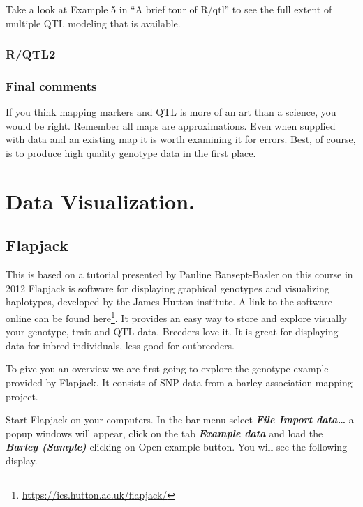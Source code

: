 \documentclass[
]{book}
\renewcommand{\href}[2]{#2\footnote{\url{#1}}}
\begin{document}
Take a look at Example 5 in ``A brief tour of R/qtl'' to see the full extent of multiple QTL modeling that is available.

\hypertarget{rqtl2}{%
\subsection{R/QTL2}\label{rqtl2}}

\hypertarget{final-comments}{%
\subsection{Final comments}\label{final-comments}}

If you think mapping markers and QTL is more of an art than a science, you would be right. Remember all maps are approximations. Even when supplied with data and an existing map it is worth examining it for errors. Best, of course, is to produce high quality genotype data in the first place.

\hypertarget{Data_Visualization}{%
\chapter{Data Visualization.}\label{Data_Visualization}}

\hypertarget{flapjack}{%
\section{Flapjack}\label{flapjack}}

This is based on a tutorial presented by Pauline Bansept-Basler on this course in 2012
Flapjack is software for displaying graphical genotypes and visualizing haplotypes, developed
by the James Hutton institute. A link to the software online can be found \href{https://ics.hutton.ac.uk/flapjack/}{here}. It provides an easy way to store and explore visually your genotype, trait and QTL data. Breeders love it. It is great for displaying data for inbred individuals, less good for outbreeders.

To give you an overview we are first going to explore the genotype example provided by Flapjack. It consists of SNP data from a barley association mapping project.

Start Flapjack on your computers. In the bar menu
select \textbf{\emph{File Import data\ldots{}}} a popup windows will appear, click on the tab \textbf{\emph{Example data}} and load the \textbf{\emph{Barley (Sample)}} clicking on Open example button.
You will see the following display.
\end{document}
